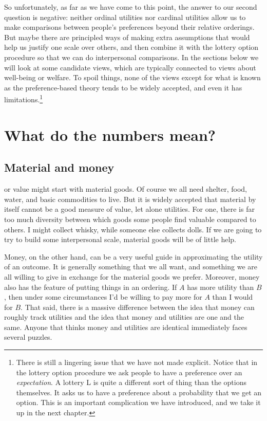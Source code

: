 \documentclass[]{tufte-book}
\begin{document}
So unfortunately, as far as we have come to this point, the answer to our second question is negative: neither ordinal utilities nor cardinal utilities allow us to make comparisons between people's preferences beyond their relative orderings. But maybe there are principled ways of making extra assumptions that would help us justify one scale over others, and then combine it with the lottery option procedure so that we can do interpersonal comparisons. In the sections below we will look at some candidate views, which are typically connected to views about well-being or welfare. To spoil things, none of the views except for what is known as the preference-based theory tends to be widely accepted, and even it has limitations.\footnote{There is still a lingering issue that we have not made explicit. Notice that in the lottery option procedure we ask people to have a preference over an \emph{expectation}. A lottery L is quite a different sort of thing than the options themselves. It asks us to have a preference about a probability that we get an option. This is an important complication we have introduced, and we take it up in the next chapter.}

\hypertarget{what-do-the-numbers-mean}{%
\section{What do the numbers mean?}\label{what-do-the-numbers-mean}}

\hypertarget{material-and-money}{%
\subsection{Material and money}\label{material-and-money}}

 or value might start with material goods. Of course we all need shelter, food, water, and basic commodities to live. But it is widely accepted that material by itself cannot be a good measure of value, let alone utilities. For one, there is far too much diversity between which goods some people find valuable compared to others. I might collect whisky, while someone else collects dolls. If we are going to try to build some interpersonal scale, material goods will be of little help.

Money, on the other hand, can be a very useful guide in approximating the utility of an outcome. It is generally something that we all want, and something we are all willing to give in exchange for the material goods we prefer. Moreover, money also has the feature of putting things in an ordering. If \(A\) has more utility than \(B\), then under some circumstances I'd be willing to pay more for \(A\) than I would for \(B\). That said, there is a massive difference between the idea that money can roughly track utilities and the idea that money and utilities are one and the same. Anyone that thinks money and utilities are identical immediately faces several puzzles.
\end{document}

